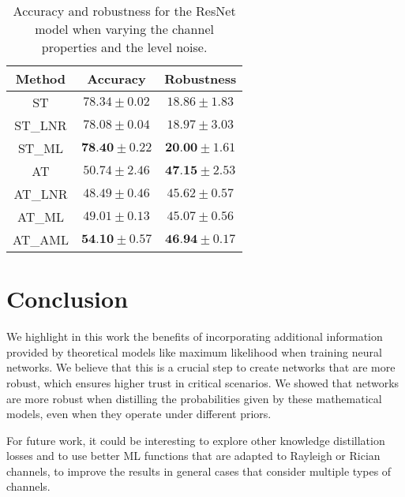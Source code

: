 \documentclass[conference]{IEEEtran}
\newcommand{\pf}[1]{{\textcolor{orange}{PF: {#1}}}}
\begin{document}
\begin{table}[htbp]
	\centering
	\begin{tabular}{c|cc}
	    Method & Accuracy & Robustness \\
		\hline
		ST & $78.34 \pm 0.02$ & $18.86 \pm 1.83$ \\ 
		ST\_LNR & $78.08 \pm 0.04$ & $18.97 \pm 3.03$ \\ 
		ST\_ML & $\textbf{78.40} \pm 0.22$ & $\textbf{20.00} \pm 1.61$ \\
		\hline
		AT & $50.74 \pm 2.46$ & $\textbf{47.15} \pm 2.53$ \\ 
		AT\_LNR & $48.49 \pm 0.46$ & $45.62 \pm 0.57$ \\ 
		AT\_ML & $49.01 \pm 0.13$ & $45.07 \pm 0.56$ \\  
		AT\_AML & $\textbf{54.10} \pm 0.57$ & $\textbf{46.94} \pm 0.17$ \\ 
    \end{tabular}
    \caption{Accuracy and robustness for the ResNet model when varying the channel properties and the level noise.}
    \label{tab:sp0c20}
\end{table}


\section{Conclusion}

We highlight in this work the benefits of incorporating additional information provided by theoretical models like maximum likelihood when training neural networks. We believe that this is a crucial step to create networks that are more robust, which ensures higher trust in critical scenarios. We showed that networks are more robust when distilling the probabilities given by these mathematical models, even when they operate under different priors.

For future work, it could be interesting to explore other knowledge distillation losses and to use better ML functions that are adapted to Rayleigh or Rician channels, to improve the results in general cases that consider multiple types of channels. 



\end{document}
